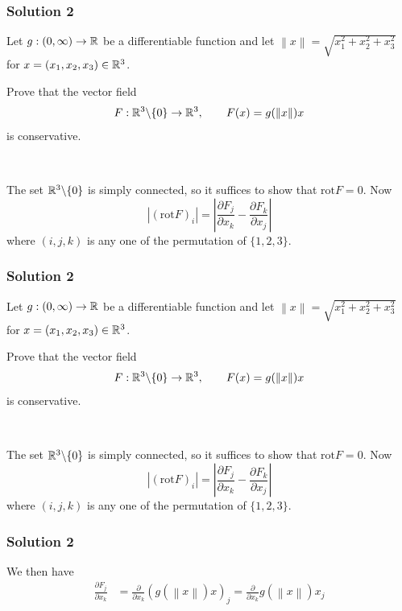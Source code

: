 \documentclass[10pt, t, allowdisplaybreaks]{beamer}
\newcommand{\nullspacesmall}{~\vspace{1em}}
\begin{document}
\begin{frame}
    \frametitle{Solution 2}
    \par Let $g:(0, \infty)\rightarrow \mathbb{R}$ be a differentiable function and let 
    $\left\lVert x\right\rVert = \sqrt{x^2_1+x^2_2+x^2_3}$ for $x = (x_1, x_2, x_3)\in \mathbb{R}^3$.
    \par Prove that the vector field 
    \begin{equation*}
        F:\mathbb{R}^3\backslash\{0\}\rightarrow \mathbb{R}^3, \qquad F(x) = g(\left\lVert x\right\rVert )x
    \end{equation*}
    is conservative.
    
    \nullspacesmall

    \par The set $\mathbb{R}^3\backslash\{0\}$ is simply connected, so it suffices to show that $\text{rot} F = 0$. Now 
    \begin{equation*}
        \left\lvert (\text{rot}F)_i\right\rvert = \left\lvert \frac{\partial F_j}{\partial x_k} - \frac{\partial F_k}{\partial x_j}\right\rvert 
    \end{equation*}
    where $(i,j,k)$ is any one of the permutation of $\{1,2,3\}$. 
\end{frame}


\begin{frame}
    \frametitle{Solution 2}
    \par Let $g:(0, \infty)\rightarrow \mathbb{R}$ be a differentiable function and let 
    $\left\lVert x\right\rVert = \sqrt{x^2_1+x^2_2+x^2_3}$ for $x = (x_1, x_2, x_3)\in \mathbb{R}^3$.
    \par Prove that the vector field 
    \begin{equation*}
        F:\mathbb{R}^3\backslash\{0\}\rightarrow \mathbb{R}^3, \qquad F(x) = g(\left\lVert x\right\rVert )x
    \end{equation*}
    is conservative.
    
    \nullspacesmall

    \par The set $\mathbb{R}^3\backslash\{0\}$ is simply connected, so it suffices to show that $\text{rot} F = 0$. Now 
    \begin{equation*}
        \left\lvert (\text{rot}F)_i\right\rvert = \left\lvert \frac{\partial F_j}{\partial x_k} - \frac{\partial F_k}{\partial x_j}\right\rvert 
    \end{equation*}
    where $(i,j,k)$ is any one of the permutation of $\{1,2,3\}$. 
\end{frame}

\begin{frame}
    \frametitle{Solution 2}
    We then have 
    \begin{equation*}
        \begin{split}
            \frac{\partial F_j}{\partial x_k} &= \frac{\partial}{\partial x_k}\left(g(\left\lVert x\right\rVert )x\right)_j
            = \frac{\partial}{\partial x_k}g(\left\lVert x\right\rVert )x_j\\\\
        \end{split}
    \end{equation*}
\end{frame}
\end{document}
